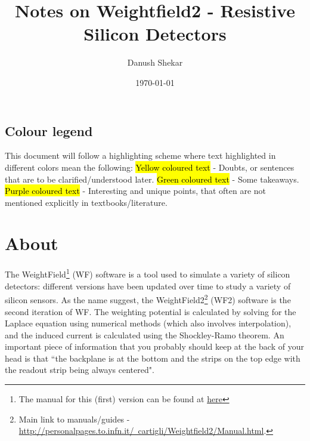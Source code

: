 \documentclass[11pt]{article}
\title{Notes on Weightfield2 - Resistive Silicon Detectors}
\author{Danush Shekar}
\date{\today}
\newcommand{\hlyellow}[1]{{\sethlcolor{yellow}\hl{#1}}}
\newcommand{\hlgreen}[1]{{\sethlcolor{green2}\hl{#1}}}
\newcommand{\hlred}[1]{{\sethlcolor{red2}\hl{#1}}}
\newcommand{\hlpurple}[1]{{\sethlcolor{purple2}\hl{#1}}}
\begin{document}
\maketitle
\tableofcontents

\newpage

\abstract{}%

\subsection*{Colour legend}
This document will follow a highlighting scheme where text highlighted in different colors mean the following:
\newline
\hlyellow{Yellow coloured text} - Doubts, or sentences that are to be clarified/understood later.\newline
\hlgreen{Green coloured text} - Some takeaways.\newline
\hlpurple{Purple coloured text} - Interesting and unique points, that often are not mentioned explicitly in textbooks/literature.

\section{About}
The WeightField\footnote{The manual for this (first) version can be found at \href{http://personalpages.to.infn.it/~cartigli/Weightfield2/Manual_files/Manual_Weightfield.pdf}{here}} (WF) software is a tool used to simulate a variety of silicon detectors: different versions have been updated over time to study a variety of silicon sensors. As the name suggest, the WeightField2\footnote{Main link to manuals/guides - \href{http://personalpages.to.infn.it/~cartigli/Weightfield2/Manual.html}{http://personalpages.to.infn.it/~cartigli/Weightfield2/Manual.html}.} (WF2) software is the second iteration of WF. The weighting potential is calculated by solving for the Laplace equation using numerical methods (which also involves interpolation), and the induced current is calculated using the Shockley-Ramo theorem. An important piece of information that you probably should keep at the back of your head is that ``the backplane is at the bottom and the strips on the top edge with the readout strip being always centered".
\end{document}
